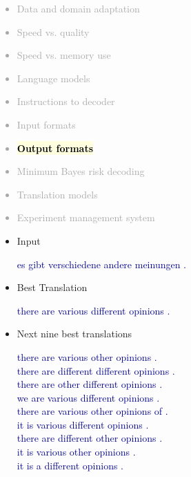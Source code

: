 \documentclass[landscape]{uedslides2C}
\newcommand{\example}[1]{\textcolor{darkblue}{\rm #1}}
\newcommand{\currenttopic}[1]{\colorbox{lightyellow}{\textcolor{black}{\bf #1}}}
\begin{document}

\vspace{-5mm}
\textcolor{darkgrey}{
\begin{itemize} \itemsep -1mm
\item Data and domain adaptation
\item Speed vs. quality
\item Speed vs. memory use
\item Language models
\item Instructions to decoder
\item Input formats
\item \currenttopic{Output formats}
\item Minimum Bayes risk decoding
\item Translation models
\item Experiment management system
\end{itemize}
}



\begin{itemize}
\item Input \vspace{-5mm}
\begin{center}
\example{es gibt verschiedene andere meinungen .}
\end{center}

\item  Best Translation \vspace{-5mm}
\begin{center}
\example{there are various different opinions .}
\end{center}

\item  Next nine best translations \vspace{-5mm}
{\footnotesize \begin{center}
\example{
there are various other opinions . \\
there are different different opinions . \\
there are other different opinions . \\
we are various different opinions . \\
there are various other opinions of . \\
it is various different opinions . \\
there are different other opinions . \\
it is various other opinions . \\
it is a different opinions .}
\end{center}}
\end{itemize}
\end{document}
